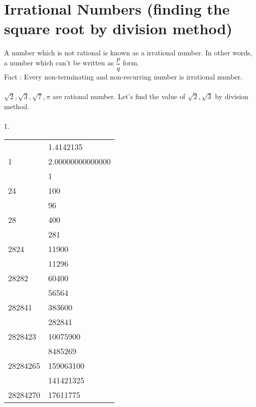 \documentclass[a4paper,10pt]{article}
\begin{document}
\section{Irrational Numbers (finding the square root by
division method)}
A number which is not rational is known as a irrational number. In other
words, a number which can’t be written as $\dfrac{p}{q}$ form.\\
Fact : Every non-terminating and non-recurring number is irrational
number.\\\\
$\sqrt{2},\sqrt{3},\sqrt{7},\pi$ are rational number.
Let’s find the value of $\sqrt{2},\sqrt{3}$ by division method.\\\\
1.\\
\begin{center}
\begin{tabular}{l|l } 
 
       & 1.4142135 \\\cline{2-2}
1      & 2.00000000000000 \\
       & 1 \\\cline{2-2} 
24     & 100\\ 
       &{\hspace{2mm}96}\\\cline{2-2} 
28     &{\hspace{4mm}400}\\
       &{\hspace{4mm}281}\\\cline{2-2}
2824   &{\hspace{4mm}11900}\\
       &{\hspace{4mm}11296}\\\cline{2-2} 
28282  &{\hspace{8mm}60400}\\ 
       &{\hspace{8mm}56564}\\\cline{2-2} 
282841 &{\hspace{10mm}383600}\\ 
       &{\hspace{10mm}282841}\\\cline{2-2}
2828423&{\hspace{10mm}10075900}\\ 
       &{\hspace{10mm}8485269}\\\cline{2-2}
28284265&{\hspace{10mm}159063100}\\
       &{\hspace{10mm}141421325}\\\cline{2-2} 
28284270&{\hspace{12mm}17611775}                              
\end{tabular}
\end{center}
\end{document}
